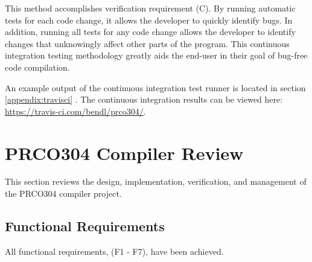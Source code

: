 \documentclass[11pt,a4paper]{report}
\newcommand{\scname}{PRCO304}
\begin{document}
This method accomplishes verification requirement (C). By running automatic tests for each code change, it allows the developer to quickly identify bugs. In addition, running all tests for any code change allows the developer to identify changes that unknowingly affect other parts of the program. This continuous integration testing methodology greatly aids the end-user in their goal of bug-free code compilation.

An example output of the continuous integration test runner is located in section \ref{appendix:travisci} {}. The continuous integration results can be viewed here: \url{https://travis-ci.com/bendl/prco304/}.

\section{\scname{} Compiler Review}
This section reviews the design, implementation, verification, and management of the \scname{} compiler project.

\subsection{Functional Requirements}
All functional requirements, (F1 - F7), have been achieved. 
\end{document}
